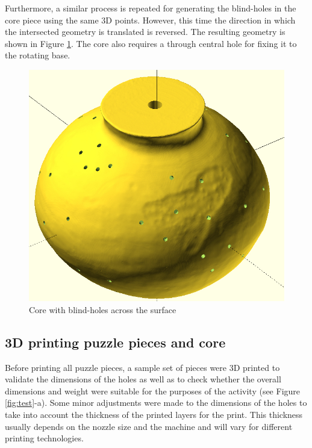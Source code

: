 \documentclass[acmlarge,screen]{acmart}
\begin{document}
Furthermore, a similar process is repeated for generating the blind-holes in the core piece using the same 3D points. However, this time the direction in which the intersected geometry is translated is reversed. The resulting geometry is shown in Figure \ref{fig:coreholes}. The core also requires a through central hole for fixing it to the rotating base. 


\begin{figure}[h]
  \centering
  \includegraphics[width=0.6\linewidth]{images/coreholes.jpg}
  \caption{\label{fig:coreholes}Core with blind-holes across the surface}
\end{figure}


\subsection{3D printing puzzle pieces and core}
Before printing all puzzle pieces, a sample set of pieces were 3D printed to validate the dimensions of the holes as well as to check whether the overall dimensions and weight were suitable for the purposes of the activity (see Figure \ref{fig:test}-a). Some minor adjustments were made to the dimensions of the holes to take into account the thickness of the printed layers for the print. This thickness usually depends on the nozzle size and the machine and will vary for different printing technologies.
\end{document}
